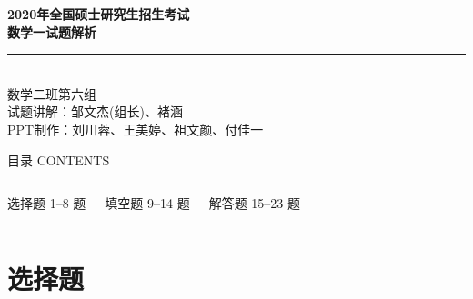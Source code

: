 \documentclass[aspectratio=169]{beamer}
\begin{document}
\begin{frame}[plain]
\vfill
\begin{center}
{\Huge\bfseries\color{mycolor} 2020年全国硕士研究生招生考试}\\[0.5em]
{\Huge\bfseries\color{mycolor} 数学一试题解析}\\[2em]
\rule{0.8\textwidth}{2pt}\\[2em]
{\large 数学二班第六组}\\[0.6em]
{\normalsize 试题讲解：邹文杰(组长)、褚涵}\\[0.6em]
{\normalsize PPT制作：刘川蓉、王美婷、祖文颜、付佳一}\\[1.2em]
\end{center}
\vfill
\end{frame}

\begin{frame}{目录 CONTENTS}
\begin{columns}[T]
\begin{block}{选择题}
1--8 题
\end{block}
\begin{block}{填空题}
9--14 题
\end{block}
\begin{block}{解答题}
15--23 题
\end{block}
\end{columns}
\end{frame}

\section{选择题}
\end{document}
